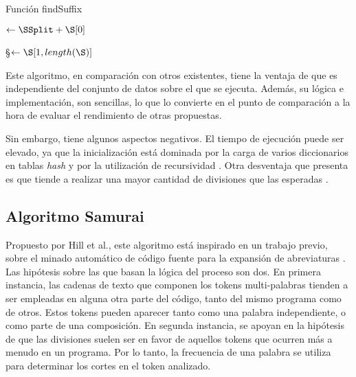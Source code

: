 \begin{algorithm}
\caption{Función findSuffix}
\label{funFindSuffix}
\DontPrintSemicolon
  
  
  
  \BlankLine
  
  \BlankLine
  
  \BlankLine
  \SSplit $\leftarrow \SSplit + \S[0] $\;
  
  \BlankLine
  \S $\leftarrow \S[1, length(\S)]$\;
  
  \BlankLine
  \KwRet \FindSuffixSSSplit
\end{algorithm}

Este algoritmo, en comparación con otros existentes, tiene la ventaja de que es independiente del conjunto de datos sobre el que se ejecuta.
Además, su lógica e implementación, son sencillas, lo que lo convierte en el punto de comparación a la hora de evaluar el rendimiento de otras propuestas.

Sin embargo, tiene algunos aspectos negativos.
El tiempo de ejecución puede ser elevado, ya que la inicialización está dominada por la carga de varios diccionarios en tablas \textit{hash} y por la utilización de recursividad \cite{FieldBinkleyLawrie06}.
Otra desventaja que presenta es que tiende a realizar una mayor cantidad de divisiones que las esperadas \cite{Feild06anempirical}.

\subsection{Algoritmo Samurai}
Propuesto por Hill et al., este algoritmo está inspirado en un trabajo previo, sobre el minado automático de código fuente para la expansión de abreviaturas \cite{Hill:2008:AAM:1370750.1370771}.
Las hipótesis sobre las que basan la lógica del proceso son dos. 
En primera instancia, las cadenas de texto que componen los tokens multi-palabras tienden a ser empleadas en alguna otra parte del código, tanto del mismo programa como de otros.
Estos tokens pueden aparecer tanto como una palabra independiente, o como parte de una composición.
En segunda instancia, se apoyan en la hipótesis de que las divisiones suelen ser en favor de aquellos tokens que ocurren más a menudo en un programa.
Por lo tanto, la frecuencia de una palabra se utiliza para determinar los cortes en el token analizado.

